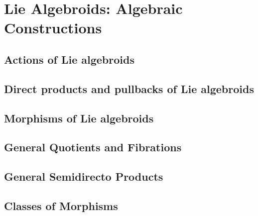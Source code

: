 \section{Lie Algebroids: Algebraic Constructions}

\subsection{Actions of Lie algebroids}

\subsection{Direct products and pullbacks of Lie algebroids}

\subsection{Morphisms of Lie algebroids}

\subsection{General Quotients and Fibrations}

\subsection{General Semidirecto Products}

\subsection{Classes of Morphisms}

